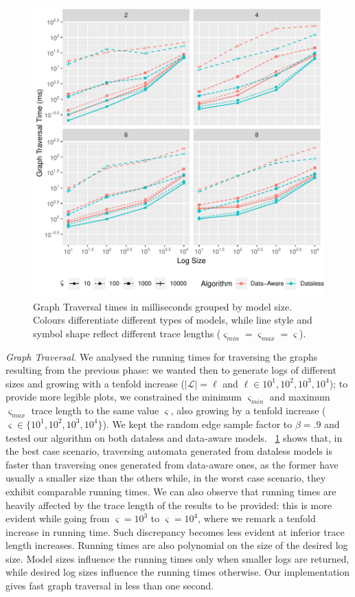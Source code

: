 \documentclass[sigconf]{acmart}
\begin{document}
\begin{figure}[!t]
\centering
\includegraphics[width=\linewidth]{fig/TraversingTimesSolo}
\caption{Graph Traversal times in milliseconds grouped by model size. Colours differentiate different types of models, while line style and symbol shape reflect different trace lengths ($\varsigma_\textit{min}=\varsigma_\textit{max}=\varsigma$).}\label{traversetimesolo}
\end{figure}
\textit{Graph Traversal.} We analysed the running times for traversing the graphs resulting from the previous phase: we wanted then to generate logs of different sizes and growing with a tenfold increase ($|\mathcal{L}|=\ell$ and $\ell\in{10^1,10^2,10^3,10^4}$); to provide more legible plots, we constrained the minimum $\varsigma_\textit{min}$ and maximum $\varsigma_\textit{max}$ trace length to the same value $\varsigma$, also growing by a tenfold increase ($\varsigma\in\{10^1,10^2,10^3,10^4\}$). We kept the random edge sample factor to $\beta=.9$ and tested our algorithm on both dataless and data-aware models. \figurename~\ref{traversetimesolo} shows that,  in the best case scenario, traversing automata generated from dataless models is faster than traversing ones generated from data-aware ones, as the former have usually a smaller size than the others while, in the worst case scenario, they exhibit comparable running times. We can also observe that running times are heavily affected by the trace length of the results to be provided: this is more evident while going from $\varsigma=10^3$ to $\varsigma=10^4$, where we remark a tenfold increase in running time. Such discrepancy becomes less evident at inferior trace length increases. Running times are also polynomial on the size of the desired log size. Model sizes influence the running times only when smaller logs are returned, while desired log sizes influence the running times otherwise. Our implementation gives fast graph traversal in less than one second. 
 
\end{document}
